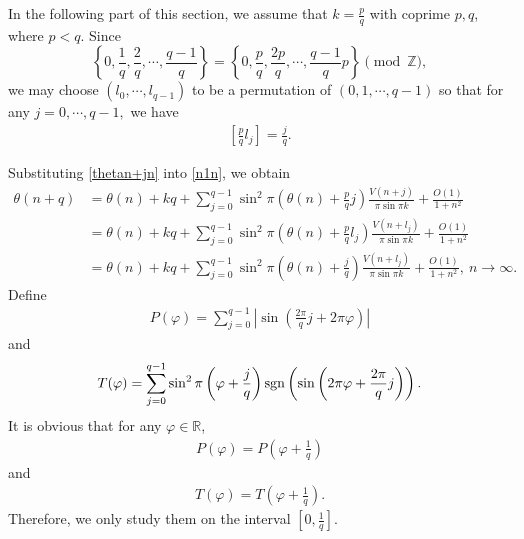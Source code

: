 \documentclass[12pt]{amsart}
\newcommand{\abs}[1]{\left\lvert #1 \right\rvert}
\theoremstyle{plain}
\newcommand{\R}{\mathbb{R}}
\newcommand{\Z}{\mathbb{Z}}
\theoremstyle{definition}
\begin{document}
In the following part of this section, we assume that
$k=\frac{p}{q}$
with coprime $p,q$, where $p<q$. Since $$\left\{0,\frac{1}{q},\frac{2}{q},\cdots,\frac{q-1}{q}\right\}=\left\{0,\frac{p}{q},\frac{2p}{q},\cdots,\frac{q-1}{q}p\right\} \pmod \Z,$$
we may choose $(l_0,\cdots, l_{q-1})$ to be a permutation of $(0,1,\cdots,q-1)$ so that for any $j=0,\cdots,q-1,$ we have
\begin{align}
	\left[\frac{p}{q}l_j\right]=\frac{j}{q}.\label{permupqlj}
\end{align}


Substituting \eqref{thetan+jn} into \eqref{n1n}, we obtain
\begin{align}
	\theta(n+q)&=\theta(n)+kq+\sum_{j=0}^{q-1}\sin^2\pi\left(\theta(n)+\frac{p}{q}j\right)\frac{V(n+j)}{\pi\sin\pi k}+\frac{O(1)}{1+n^2}\nonumber\\
	&=\theta(n)+kq+\sum_{j=0}^{q-1}\sin^2\pi\left(\theta(n)+\frac{p}{q}l_j\right)\frac{V(n+l_j)}{\pi\sin\pi k}+\frac{O(1)}{1+n^2}\nonumber\\
	\label{bhgx2}&=\theta(n)+kq+\sum_{j=0}^{q-1}\sin^2\pi\left(\theta(n)+\frac{j}{q}\right)\frac{V(n+l_j)}{\pi\sin\pi k}+\frac{O(1)}{1+n^2},\ n\to\infty.
\end{align}
Define
\begin{align}
	P(\varphi)=\sum_{j=0}^{q-1}\abs{\sin\left(\frac{2\pi}{q}j+2\pi\varphi\right)}\label{definitionofP_qtheta}
\end{align}
and
\begin{align}
	T(\varphi)=\sum_{j=0}^{q-1}\sin^2\pi\left(\varphi+\frac{j}{q}\right){\rm{sgn}}\left(\sin\left(2\pi\varphi+\frac{2\pi}{q}j\right)\right).\label{definitionofT_qtheta}
\end{align}
It is obvious that for any $\varphi\in\R$,
\begin{align}
	P(\varphi)=P\left(\varphi+\frac{1}{q}\right)\label{perioPvarphi}
\end{align}
and
\begin{align}
		T(\varphi)=T\left(\varphi+\frac{1}{q}\right)\label{perioTvarphi}.
\end{align}
Therefore,  we only study them on the interval $\left[0,\frac{1}{q}\right]$.
	
\end{document}
